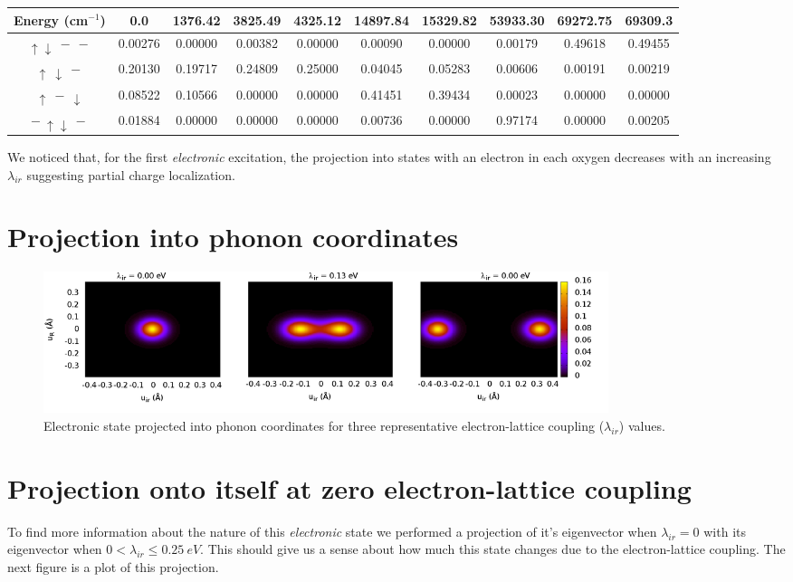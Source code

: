 \noindent\begin{tabular}{| c | c | c | c | c | c | c | c | c | c |}
\hline
Energy (cm$^{-1}$) & 0.0 & 1376.42 & 3825.49 & 4325.12 & 14897.84 & 15329.82 & 53933.30 & 69272.75 & 69309.3 \\
\hline
$\uparrow \downarrow \ - \ -$ & 0.00276 & 0.00000 & 0.00382 & 0.00000 & 0.00090 & 0.00000 & 0.00179 & 0.49618 & 0.49455 \\
$\uparrow\  \downarrow \ -$ & 0.20130 & 0.19717 & 0.24809 & 0.25000 & 0.04045 & 0.05283 & 0.00606 & 0.00191 & 0.00219 \\
$\uparrow \ - \ \downarrow$ & 0.08522 & 0.10566 & 0.00000 & 0.00000 & 0.41451 & 0.39434 & 0.00023 & 0.00000 & 0.00000 \\
$ - \ \uparrow \downarrow \ -$ & 0.01884 & 0.00000 & 0.00000 & 0.00000 & 0.00736 & 0.00000 & 0.97174 & 0.00000 & 0.00205 \\
\hline
\end{tabular}

We noticed\cite{GarciaSaraviaOrtizdeMontellano2013} that, for the first \textit{electronic} excitation, the projection into states with an electron in each oxygen decreases with an increasing $\lambda_{ir}$ suggesting partial charge localization.

\section{Projection into phonon coordinates}

\begin{figure}[ht!]
\centering
\includegraphics[width=0.8\textwidth]{images/ph-electronic.png}
\caption{Electronic state projected into phonon coordinates for three representative electron-lattice coupling ($\lambda_{ir}$) values.}
\label{fig:ph-electronic.png}
\end{figure}


\section{Projection onto itself at zero electron-lattice coupling}


To find more information about the nature of this \textit{electronic} state we performed a projection of it's eigenvector when $\lambda_{ir}=0$ with its eigenvector when $0<\lambda_{ir}\leq 0.25\ eV$. This should give us a sense about how much this state changes due to the electron-lattice coupling. The next figure is a plot of this projection. 

